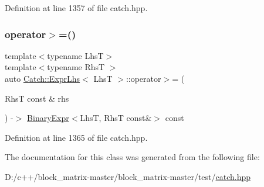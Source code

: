 Definition at line 1357 of file catch.\+hpp.

\mbox{\label{class_catch_1_1_expr_lhs_aff594ae5b957105c517a6257d2e730f0}} 
\subsubsection{\texorpdfstring{operator$>$=()}{operator>=()}}
{\footnotesize\ttfamily template$<$typename LhsT$>$ \\
template$<$typename RhsT $>$ \\
auto \mbox{\hyperlink{class_catch_1_1_expr_lhs}{Catch\+::\+Expr\+Lhs}}$<$ LhsT $>$\+::operator$>$= (\begin{DoxyParamCaption}\item[{RhsT const \&}]{rhs }\end{DoxyParamCaption}) -\/$>$ \mbox{\hyperlink{class_catch_1_1_binary_expr}{Binary\+Expr}}$<$LhsT, RhsT const\&$>$ const \hspace{0.3cm}{\ttfamily [inline]}}



Definition at line 1365 of file catch.\+hpp.



The documentation for this class was generated from the following file\+:\begin{DoxyCompactItemize}
\item 
D\+:/c++/block\+\_\+matrix-\/master/block\+\_\+matrix-\/master/test/\mbox{\hyperlink{catch_8hpp}{catch.\+hpp}}\end{DoxyCompactItemize}
